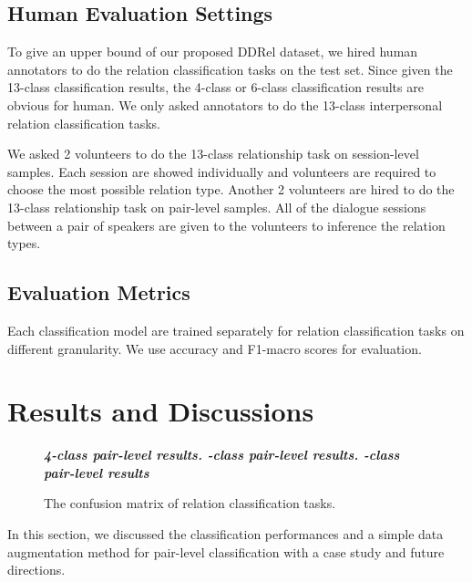 \documentclass[letterpaper]{article} \usepackage{aaai21}  \usepackage{times}  \usepackage{helvet} \usepackage{courier}  \usepackage[hyphens]{url}  \usepackage{graphicx} \usepackage{xcolor}
\begin{document}
\subsection{Human Evaluation Settings}

To give an upper bound of our proposed DDRel dataset, we hired human annotators to do the relation classification tasks on the test set. Since given the 13-class classification results, the 4-class or 6-class classification results are obvious for human. We only asked annotators to do the 13-class interpersonal relation classification tasks.

We asked 2 volunteers to do the 13-class relationship task on session-level samples.  Each session are showed individually and volunteers are required to choose the most possible relation type. 
Another 2 volunteers are hired to do the 13-class relationship task on pair-level samples. All of the dialogue sessions between a pair of speakers are given to the volunteers to inference the relation types.


\subsection{Evaluation Metrics}
\label{sec:metrics}
Each classification model are trained separately for relation classification tasks on different granularity. We use accuracy and F1-macro scores for evaluation.



 
\section{Results and Discussions}
\label{sec:results}

\begin{figure*}
	\centering
	\textbf{\em  4-class pair-level results. \quad\quad {}-class pair-level results.    \quad      \quad{}-class pair-level results}\vspace{-1.0cm}\\
	\vspace{-1cm}
	\caption{The confusion matrix of relation classification tasks.}
	\label{fig:confusion}
\end{figure*}
In this section, we discussed the classification performances and a simple data augmentation method for pair-level classification with a case study and future directions.
\end{document}

